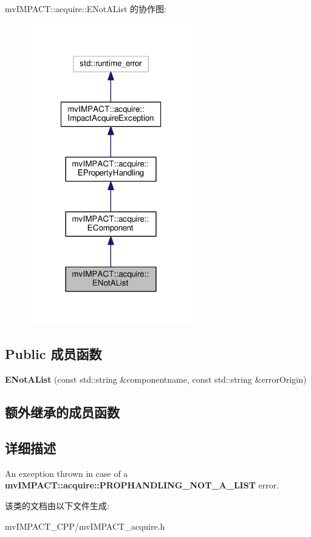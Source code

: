 mv\+I\+M\+P\+A\+C\+T\+:\+:acquire\+:\+:E\+Not\+A\+List 的协作图\+:
\nopagebreak
\begin{figure}[H]
\begin{center}
\leavevmode
\includegraphics[width=202pt]{classmv_i_m_p_a_c_t_1_1acquire_1_1_e_not_a_list__coll__graph}
\end{center}
\end{figure}
\subsection*{Public 成员函数}
\begin{DoxyCompactItemize}
\item 
\hypertarget{classmv_i_m_p_a_c_t_1_1acquire_1_1_e_not_a_list_a3b18a29f9997d682079e4e61c1860450}{{\bfseries E\+Not\+A\+List} (const std\+::string \&componentname, const std\+::string \&error\+Origin)}\label{classmv_i_m_p_a_c_t_1_1acquire_1_1_e_not_a_list_a3b18a29f9997d682079e4e61c1860450}

\end{DoxyCompactItemize}
\subsection*{额外继承的成员函数}


\subsection{详细描述}
An exception thrown in case of a {\bfseries mv\+I\+M\+P\+A\+C\+T\+::acquire\+::\+P\+R\+O\+P\+H\+A\+N\+D\+L\+I\+N\+G\+\_\+\+N\+O\+T\+\_\+\+A\+\_\+\+L\+I\+S\+T} error. 

该类的文档由以下文件生成\+:\begin{DoxyCompactItemize}
\item 
mv\+I\+M\+P\+A\+C\+T\+\_\+\+C\+P\+P/mv\+I\+M\+P\+A\+C\+T\+\_\+acquire.\+h\end{DoxyCompactItemize}
